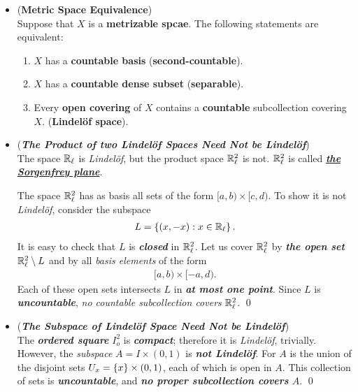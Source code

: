 \documentclass[11pt]{article}
\begin{document}
\begin{itemize}
\item \begin{proposition}  (\textbf{Metric Space Equivalence}) \citep{munkres2000topology}\\
Suppose that $X$ is a \textbf{metrizable spcae}. The following statements are equivalent: 
\begin{enumerate}
\item $X$ has a \textbf{countable basis} (\textbf{second-countable}).
\item $X$ has a \textbf{countable dense subset} (\textbf{separable}).
\item Every \textbf{open covering} of $X$ contains a \textbf{countable} subcollection covering $X$. (\textbf{Lindel{\"o}f space}).
\end{enumerate}
\end{proposition}



\item \begin{example} (\emph{\textbf{The Product of two Lindel{\"o}f Spaces Need Not be Lindel{\"o}f}})\\
The space ${\mathbb R}_{\ell}$ is \emph{Lindel{\"o}f}, but the product space ${\mathbb R}_{\ell}^2$ is not. ${\mathbb R}_{\ell}^2$ is called \underline{\emph{\textbf{the Sorgenfrey plane}}}.

The space ${\mathbb R}_{\ell}^2$ has as basis all sets of the form $[a, b) \times [c, d)$. To show it is not \emph{Lindel{\"o}f}, consider the subspace
\begin{align*}
L = \left\{(x, -x): x\in {\mathbb R}_{\ell}\right\}.
\end{align*}
It is easy to check that $L$ is \emph{\textbf{closed}} in ${\mathbb R}_{\ell}^2$. Let us cover ${\mathbb R}_{\ell}^2$ by \emph{\textbf{the open set}} ${\mathbb R}_{\ell}^2 \setminus L$ and by
all \emph{basis elements} of the form
\begin{align*}
[a, b) \times [-a, d).
\end{align*}
Each of these open sets intersects $L$ in \emph{\textbf{at most one point}}. Since $L$ is \emph{\textbf{uncountable}}, \emph{no countable subcollection covers} ${\mathbb R}_{\ell}^2$. \qed
\end{example}

\item \begin{example} (\emph{\textbf{The Subspace of Lindel{\"o}f Space Need Not be Lindel{\"o}f}})\\
The \emph{\textbf{ordered square}} $I_o^2$ is \emph{\textbf{compact}}; therefore it is \emph{Lindel{\"o}f}, trivially. However, the \emph{subspace} $A = I \times (0, 1)$ is \emph{\textbf{not Lindel{\"o}f}}. For $A$ is the union of the disjoint sets $U_x = \left\{x\right\} \times (0, 1)$, each of which is open in $A$. This collection of sets is \emph{\textbf{uncountable}}, and \emph{\textbf{no proper subcollection covers} $A$}. \qed
\end{example}


\end{itemize}
\end{document}
